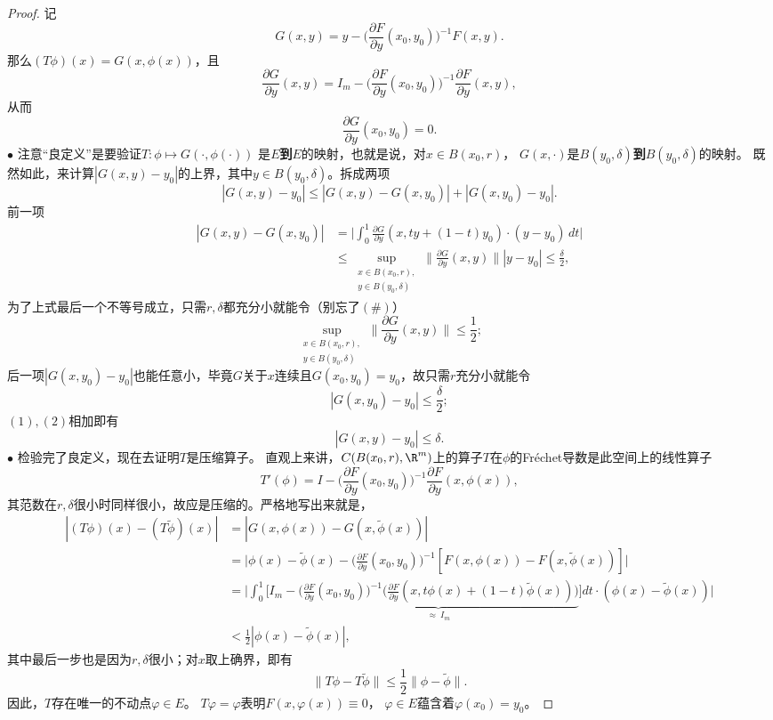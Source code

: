 \begin{proof}
    记\[G(x,y)=y-\bigg(\frac{\partial F}{\partial y}(x_0,y_0)\bigg)^{-1}F(x,y).\]
    那么$(T\phi)(x)=G(x,\phi(x))$，且
    \[\frac{\partial G}{\partial y}(x,y)
    =I_m-\bigg(\frac{\partial F}{\partial y}(x_0,y_0)\bigg)^{-1}\frac{\partial F}{\partial y}(x,y),\]
    从而\[\frac{\partial G}{\partial y}(x_0,y_0)=0.\tag{\#}\]
    $\bullet$ 注意``良定义''是要验证$T\colon\phi \mapsto G(\cdot,\phi(\cdot))$
    是$E$\textbf{到$E$}的映射，也就是说，对$x\in B(x_0,r)$，
    $G(x,\cdot)$是$B(y_0,\delta)$\textbf{到$B(y_0,\delta)$}的映射。
    既然如此，来计算$|G(x,y)-y_0|$的上界，其中$y\in B(y_0,\delta)$。拆成两项
    \[|G(x,y)-y_0|\leqslant|G(x,y)-G(x,y_0)|+|G(x,y_0)-y_0|.\]
    前一项
    \begin{align*}\tag{1}
        |G(x,y)-G(x,y_0)|&=\bigg|\int_0^1 \frac{\partial G}{\partial y}(x,ty+(1-t)y_0)\cdot(y-y_0)\,dt\bigg|\\
        &\leqslant\sup_{\substack{x\in B(x_0,r),\\y\in B(y_0,\delta)}}\bigg\|\frac{\partial G}{\partial y}(x,y)\bigg\||y-y_0|
        \leqslant\frac{\delta}{2},
    \end{align*}
    为了上式最后一个不等号成立，只需$r,\delta$都充分小就能令（别忘了$(\#)$）
    \[\sup_{\substack{x\in B(x_0,r),\\y\in B(y_0,\delta)}}\bigg\|\frac{\partial G}{\partial y}(x,y)\bigg\|\leqslant\frac{1}{2};\]
    后一项$|G(x,y_0)-y_0|$也能任意小，毕竟$G$关于$x$连续且$G(x_0,y_0)=y_0$，故只需$r$充分小就能令
    \[\tag{2}|G(x,y_0)-y_0|\leqslant\frac{\delta}{2};\]
    $(1),(2)$相加即有
    \[|G(x,y)-y_0|\leqslant\delta.\]
    $\bullet$ 检验完了良定义，现在去证明$T$是压缩算子。
    直观上来讲，$C(B(x_0,r),\R^m)$上的算子$T$在$\phi$的Fréchet导数是此空间上的线性算子
    \[T'(\phi)=I-\bigg(\frac{\partial F}{\partial y}(x_0,y_0)\bigg)^{-1}\frac{\partial F}{\partial y}(x,\phi(x)),\]
    其范数在$r,\delta$很小时同样很小，故应是压缩的。严格地写出来就是，
    \begin{align*}
        |(T\phi)(x)-(T\tilde{\phi})(x)|&=|G(x,\phi(x))-G(x,\tilde{\phi}(x))|\\
        &=\bigg|\phi(x)-\tilde{\phi}(x)-\bigg(\frac{\partial F}{\partial y}(x_0,y_0)\bigg)^{-1}[F(x,\phi(x))-F(x,\tilde{\phi}(x))]\bigg|\\
        &=\bigg|\int_0^1\bigg[I_m-\underbrace{\bigg(\frac{\partial F}{\partial y}(x_0,y_0)\bigg)^{-1}
        \bigg(\frac{\partial F}{\partial y}(x,t\phi(x)+(1-t)\tilde{\phi}(x))\bigg)}_{\approx\ I_m}\bigg]dt\cdot(\phi(x)-\tilde{\phi}(x))\bigg|\\
        &<\frac{1}{2}|\phi(x)-\tilde{\phi}(x)|,
    \end{align*}
    其中最后一步也是因为$r,\delta$很小；对$x$取上确界，即有
    \[\|T\phi-T\tilde{\phi}\|\leqslant\frac{1}{2}\|\phi-\tilde{\phi}\|.\]
    因此，$T$存在唯一的不动点$\varphi\in E$。
    $T\varphi=\varphi$表明$F(x,\varphi(x))\equiv0$，
    $\varphi\in E$蕴含着$\varphi(x_0)=y_0$。
\end{proof}
